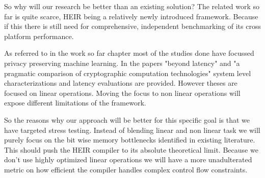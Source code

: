 So why will our research be better than an existing solution? The related work so far is quite scarce, HEIR being a relatively newly introduced framework. Because if this there is still need for comprehensive, independent benchmarking of its cross platform performance.

As referred to in the work so far chapter most of the studies done have focussed privacy preserving machine learning. In the papers "beyond latency" \cite{huang2026beyond} and "a pragmatic comparison of cryptographic computation technologies" \cite{taubert2026pragmatic} system level characterizations and latency evaluations are provided. However theses are focused on linear operations. Moving the focus to non linear operations will expose different limitations of the framework.

So the reasons why our approach will be better for this specific goal is that we have targeted stress testing. Instead of blending linear and non linear task we will purely focus on the bit wise memory bottlenecks identified in existing literature. This should push the HEIR compiler to its absolute theoretical limit. Because we don't use highly optimized linear operations we will have a more unadulterated metric on how efficient the compiler handles complex control flow constraints.



